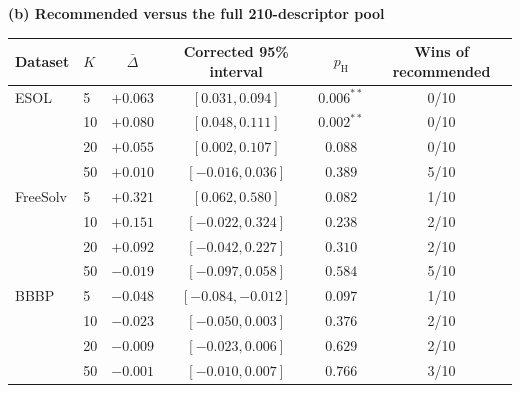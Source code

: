 \begin{table}[H]
\medskip\textbf{(b) Recommended versus the full 210-descriptor pool}\par\smallskip
\begin{tabular}{@{}llcccc@{}}
\toprule
Dataset & $K$ & $\bar\Delta$ & Corrected 95\% interval & $p_{\mathrm{H}}$ & Wins of recommended \\
\midrule
ESOL & 5 & $+0.063$ & $[0.031,0.094]$ & $0.006^{**}$ & 0/10 \\
 & 10 & $+0.080$ & $[0.048,0.111]$ & $0.002^{**}$ & 0/10 \\
 & 20 & $+0.055$ & $[0.002,0.107]$ & $0.088$ & 0/10 \\
 & 50 & $+0.010$ & $[-0.016,0.036]$ & $0.389$ & 5/10 \\
\midrule
FreeSolv & 5 & $+0.321$ & $[0.062,0.580]$ & $0.082$ & 1/10 \\
 & 10 & $+0.151$ & $[-0.022,0.324]$ & $0.238$ & 2/10 \\
 & 20 & $+0.092$ & $[-0.042,0.227]$ & $0.310$ & 2/10 \\
 & 50 & $-0.019$ & $[-0.097,0.058]$ & $0.584$ & 5/10 \\
\midrule
BBBP & 5 & $-0.048$ & $[-0.084,-0.012]$ & $0.097$ & 1/10 \\
 & 10 & $-0.023$ & $[-0.050,0.003]$ & $0.376$ & 2/10 \\
 & 20 & $-0.009$ & $[-0.023,0.006]$ & $0.629$ & 2/10 \\
 & 50 & $-0.001$ & $[-0.010,0.007]$ & $0.766$ & 3/10 \\
\bottomrule
\end{tabular}
\end{table}

